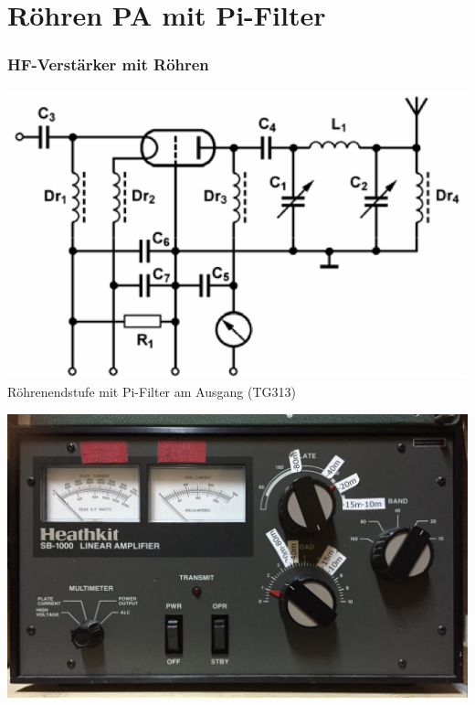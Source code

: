 

\subtitle{Technik A17: \\
  Schaltungstechnik \\[2em]}
\date{Stand 29.06.2016}


\section*{Röhren PA mit Pi-Filter}
\begin{frame}
  \frametitle{HF-Verstärker mit Röhren}
  \begin{center}
    \includegraphics[width=1\textwidth,height=.75\textheight,keepaspectratio]{a17/TG313.png}
    {\tiny \hyperlink{refs}{\cite{bna}}}\\
    Röhrenendstufe mit Pi-Filter am Ausgang (TG313)
  \end{center}
\end{frame}

\begin{frame}
  \begin{center}
    \includegraphics[width=\textwidth,height=.95\textheight,keepaspectratio]{a07/Heathkit.jpg}
    \tiny \hyperlink{refs}{\cite{dc4lw}}
  \end{center}
\end{frame}


